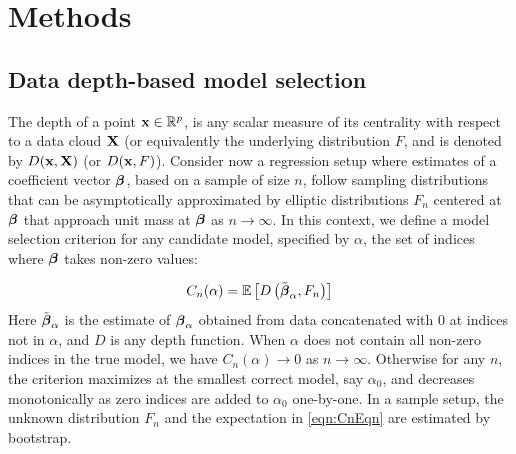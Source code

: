 \documentclass[11pt,twocolumn,twoside]{IEEEtran}
\begin{document}
\section{Methods}


\subsection{Data depth-based model selection}
The depth of a point ${\bf{x}} \in \mathbb{R}^p$, is any scalar measure of its centrality with respect to a data cloud ${\mathbf{X}}$ (or equivalently the underlying distribution $F$\cite{ZuoSerfling00c}, and is denoted by $D({\bf{x}}, {\mathbf{X}})$ (or $D({\bf{x}}, F)$). Consider now a regression setup where estimates of a coefficient vector ${\boldsymbol{\beta}}$, based on a sample of size $n$, follow sampling distributions that can be asymptotically approximated by elliptic distributions $F_n$ centered at ${\boldsymbol{\beta}}$ that approach unit mass at ${\boldsymbol{\beta}}$ as $n \rightarrow \infty$. In this context, we define a model selection criterion for any candidate model, specified by $\alpha$, the set of indices where ${\boldsymbol{\beta}}$ takes non-zero values:

\begin{equation}\label{eqn:CnEqn}
C_n(\alpha) = \mathbb E \left[ D \left( \tilde {{\boldsymbol{\beta}}}_\alpha, F_n \right) \right]
\end{equation}
Here $\tilde {{\boldsymbol{\beta}}}_\alpha$ is the estimate of ${\boldsymbol{\beta}}_\alpha$ obtained from data concatenated with 0 at indices not in $\alpha$, and $D$ is any depth function. When $\alpha$ does not contain all non-zero indices in the true model, we have $C_n(\alpha) \rightarrow 0$ as $n \rightarrow \infty$\cite{MajumdarMS}. Otherwise for any $n$, the criterion maximizes at the smallest correct model, say $\alpha_0$, and decreases monotonically as zero indices are added to $\alpha_0$ one-by-one. In a sample setup, the unknown distribution $F_n$ and the expectation in \ref{eqn:CnEqn} are estimated by bootstrap.
\end{document}
